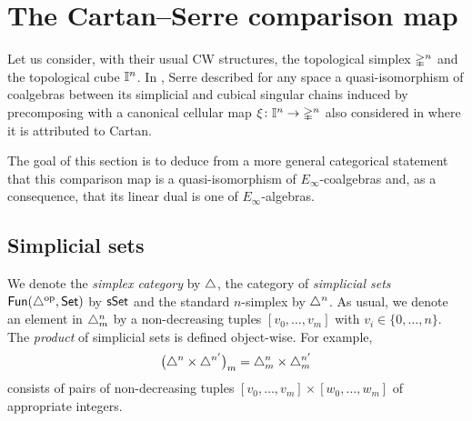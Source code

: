 
\section{The Cartan--Serre comparison map} \label{s:the cartan-serre comparison map}

Let us consider, with their usual CW structures, the topological simplex $\mathbb{\Delta}^n$
and the topological cube $\mathbb{I}^n$.
In \cite[p. 442]{serre1951homologie}, Serre described for any space a quasi-isomorphism of coalgebras between its simplicial and cubical singular chains induced by precomposing with a canonical cellular map $\operatorname{\xi} \colon \mathbb{I}^n \to \mathbb{\Delta}^n$ also considered in \cite[p.199]{eilenberg1953acyclic} where it is attributed to Cartan.



The goal of this section is to deduce from a more general categorical statement that this comparison map is a quasi-isomorphism of $E_\infty$-coalgebras and, as a consequence, that its linear dual is one of $E_\infty$-algebras.

\subsection{Simplicial sets}

We denote the \textit{simplex category} by $\triangle$, the category of \textit{simplicial sets} $\mathsf{Fun}(\triangle^{\mathrm{op}}, \mathsf{Set})$ by $\mathsf{sSet}$ and the standard $n$-simplex by $\triangle^n$.
As usual, we denote an element in $\triangle^n_m$ by a non-decreasing tuples $[v_0, \dots, v_m]$ with $v_i \in \{0, \dots, n\}$.
The \textit{product} of simplicial sets is defined object-wise.
For example,
\[
\big(\triangle^n \times \triangle^{n^\prime}\big)_m = \triangle^n_m \times \triangle^{n^\prime}_m
\]
consists of pairs of non-decreasing tuples $[v_0, \dots, v_m] \times [w_0, \dots, w_m]$ of appropriate integers.

